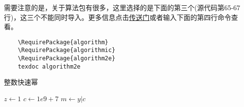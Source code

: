 需要注意的是，关于算法包有很多，这里选择的是下面的第三个(源代码第65-67行)，这三个不能同时导入。更多信息点击\href{https://www.overleaf.com/learn/latex/Algorithms}{传送门}或者输入下面的第四行命令查看。
\begin{tcolorbox}[colback=gray!10,
    colframe=black,
    width=16cm,
    arc=1mm, auto outer arc,
    boxrule=0.5pt,]
\begin{verbatim}
    \RequirePackage{algorithm}
    \RequirePackage{algorithmic}
    \RequirePackage{algorithm2e} 
    texdoc algorithm2e 
\end{verbatim}
\end{tcolorbox}

\begin{algorithm}[H]
    \SetAlgoLined
    \caption{整数快速幂}
    $z \gets 1$ \;
    $c \gets 1e9+7$\;
    $m \gets y | c$\;
\end{algorithm}